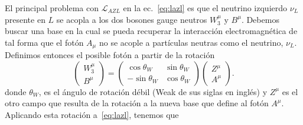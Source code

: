 El principal problema con $\mathcal{L}_{AZL}$ en la ec.~\eqref{eq:lazl} es que el neutrino izquierdo $\nu_L$ presente en $L$ se acopla a los dos bosones gauge neutros $W_3^{\mu}$ y $B^{\mu}$. Debemos buscar una base en la cual se pueda recuperar la interacción electromagnética de tal forma que el fotón $A_{\mu}$ no se acople a partículas neutras como el neutrino, $\nu_L$. Definimos entonces el posible fotón a partir de la rotación
\begin{equation}
\label{eq:rottw}
  \begin{pmatrix}
    W_3^\mu\\
    B^\mu
  \end{pmatrix}=\begin{pmatrix}
    \cos\theta_W & \sin\theta_W\\
    -\sin\theta_W& \cos\theta_W
  \end{pmatrix}
  \begin{pmatrix}
    Z^\mu\\
    A^\mu
  \end{pmatrix}.
\end{equation}
donde $\theta_{W}$, es el ángulo de rotación débil (Weak de sus siglas en inglés) y $Z^{\mu}$ es el otro campo que resulta de la rotación a la nueva base que define al fotón $A^{\mu}$.
Aplicando esta rotación a~\eqref{eq:lazl}, tenemos que
